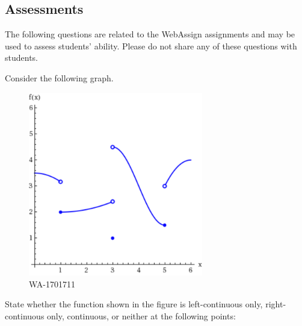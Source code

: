 \documentclass[12pt,addpoints, answers, fleqn]{exam}
\begin{document}
\begin{teacher}
\subsection{Assessments}
The following questions are related to the WebAssign assignments and may be used to assess students' ability. Please do not share any of these questions with students.
\begin{questions}		
\question 	%

Consider the following graph.
\begin{figure}[htbp] %
   \centering
   \includegraphics[width=3in]{./graphics/1701711.pdf} 
   \caption{WA-1701711}
   \label{fig:1701711}
\end{figure}

\begin{solution}
\end{solution}

State whether the function shown in the figure is left-continuous only, right-continuous only, continuous, or neither at the following points:


\end{questions}
\end{teacher}
\end{document}
